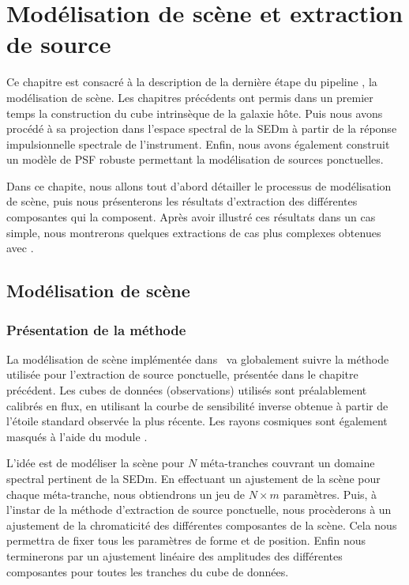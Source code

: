 \documentclass[../main/main.tex]{subfiles}
\begin{document}
\dominitoc
\faketableofcontents
\setcounter{chapter}{7}
\chapter{Modélisation de scène et extraction de source}\label{ch:res}
\minitoc
\vspace{2cm}
Ce chapitre est consacré à la description de la dernière étape du pipeline \hypergal, la
modélisation de scène. Les chapitres précédents ont permis dans un
premier temps la
construction du cube intrinsèque de la galaxie hôte. Puis nous avons
procédé à sa projection dans
l'espace spectral de la SEDm à partir de la réponse impulsionnelle
spectrale de l'instrument. Enfin, nous avons également construit un modèle
de PSF robuste permettant la modélisation de sources ponctuelles.

Dans ce chapite, nous allons tout d'abord détailler le processus de
modélisation de scène, puis nous présenterons les résultats d'extraction des
différentes composantes qui la composent. Après avoir illustré ces
résultats dans un cas simple, nous montrerons quelques extractions de cas
plus complexes obtenues avec \hypergal.
\newpage

\section{Modélisation de scène}

\subsection{Présentation de la méthode}

La modélisation de scène implémentée dans \hypergal\ va globalement
suivre la méthode utilisée pour l'extraction de source ponctuelle,
présentée dans le chapitre précédent. Les cubes de données (observations) utilisés sont
préalablement calibrés en flux, en utilisant la courbe de sensibilité
inverse obtenue à partir de l'étoile standard observée la plus
récente. Les rayons cosmiques sont également masqués à l'aide du module
 \citep{Kimcontsep}.

L'idée est de modéliser la scène pour $N$ méta-tranches couvrant un
domaine spectral pertinent de la SEDm. En effectuant un ajustement de la
scène pour chaque méta-tranche, nous obtiendrons un jeu de
$N\times m$ paramètres. Puis, à l'instar de la méthode d'extraction de source
ponctuelle, nous procèderons à un ajustement de la chromaticité des
différentes composantes de la scène. Cela nous permettra de fixer tous
les paramètres de forme et de position. Enfin nous terminerons par un ajustement linéaire
des amplitudes des différentes composantes pour toutes les tranches du cube de données.
\end{document}
